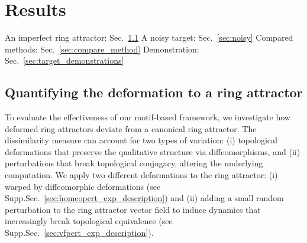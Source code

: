 \documentclass{article}
\theoremstyle{definition} \newtheorem{definition}{Definition}  \newtheorem{example}{Example}
\theoremstyle{remark} \newtheorem{remark}{Remark}
\newcounter{ct}
\begin{document}






\section{Results}
An imperfect ring attractor: Sec.~\ref{sec:imp_ring}
A noisy target: Sec.~\ref{sec:noisy}
Compared methods: Sec.~\ref{sec:compare_method}
Demonstration: Sec.~\ref{sec:target_demonstrations}




\subsection{Quantifying the deformation to a ring attractor}\label{sec:imp_ring}
To evaluate the effectiveness of our motif-based framework, we investigate how deformed ring attractors deviate from a canonical ring attractor. 
The dissimilarity measure can account for two types of variation: 
(i) topological deformations that preserve the qualitative structure via diffeomorphisms, and 
(ii) perturbations that break topological conjugacy, altering the underlying computation.
%
We apply two different deformations to the ring attractor:
(i) warped by diffeomorphic deformations (see Supp.Sec.~\ref{sec:homeopert_exp_description}) and 
(ii) adding a small random perturbation to the ring attractor vector field to induce dynamics that increasingly break topological equivalence (see Supp.Sec.~\ref{sec:vfpert_exp_description}).
\end{document}
